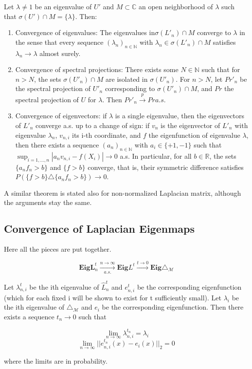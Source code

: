 \begin{theorem}
	Let $\lambda\neq 1 $ be an eigenvalue of $U'$ and $M\subset \mathbb C$ an open neighborhood of $\lambda$ such that $\sigma(U')\cap M=\{\lambda\}$. Then:
\begin{enumerate}
	\item Convergence of eigenvalues: The eigenvalues in$\sigma(L'_n)\cap M$ converge to $\lambda$ in the sense that every sequence $(\lambda_n)_{n\in\mathbb N}$ with $\lambda_n\in\sigma(L'_n)\cap M$ satisfies $\lambda_n\rightarrow \lambda$ almost surely.
	\item Convergence of spectral projections: There exists some $N\in\mathbb N$ such that for $n>N$, the sets $\sigma(U'_n)\cap M$ are isolated in $\sigma(U'_n)$. For $n>N$, let $Pr'_n$ be the spectral projection of $U'_n$ corresponding to $\sigma(U'_n)\cap M$, and $Pr$ the spectral projection of $U$ for $\lambda$. Then $Pr'_n\xrightarrow p Pr a.s.$
	\item Convergence of eigenvectors: if $\lambda$ is a single eigenvalue, then the eigenvectors of $L'_n$ converge a.s. up to a change of sign: if $v_n$ is the eigenvector
	of $L'_n$ with eigenvalue $\lambda_n$, $v_{n,i}$ its i-th coordinate, and $f$ the eigenfunction of eigenvalue $\lambda$, then there exists a sequence $(a_n)_{n\in\mathbb N}$ with $a_i \in \{+1,-1\}$ such that $\sup_{i=1,...,n} |a_nv_{n,i} - f(X_i)| \rightarrow 0$ a.s. In particular, for all $b \in\mathbb R$, the sets $\{a_nf_n > b\}$ and $\{f > b\}$ converge, that is, their symmetric difference satisfies $P(\{f > b\}\triangle\{a_nf_n > b\}) \rightarrow 0$.
\end{enumerate}
\end{theorem}

A similar theorem is stated also for non-normalized Laplacian matrix, although the arguments stay the same.
\subsection{Convergence of Laplacian Eigenmaps}
Here all the pieces are put together. 

 $$ \mathbf{Eig} \mathbf{ L}^t_n \xrightarrow[a.s.]{n\to\infty} \mathbf{Eig} L^t \xrightarrow{t\to0} \mathbf{Eig} \triangle_\mathcal M $$
 
 \begin{theorem}
 	Let $\lambda_{n,i}^t$ be the ith eigenvalue of $\hat L_n^t$ and $e^t_{n,i}$ be the corresponding eigenfunction (which for each fixed i will be shown to exist for t sufficiently small). Let $\lambda_{i}$ be the ith eigenvalue of $\triangle_\mathcal M$ and $e_{i}$ be the corresponding eigenfunction. Then there exists a sequence $t_n\rightarrow 0$ such that
 	
 	$$\lim_{n\rightarrow\infty} \lambda_{n,i}^{t_n}=\lambda_i$$
 	$$\lim_{n\rightarrow\infty}||e_{n,i}^{t_n}(x) - e_i(x)||_2 = 0$$
 	
 	where the limits are in probability.
 	
 \end{theorem}

